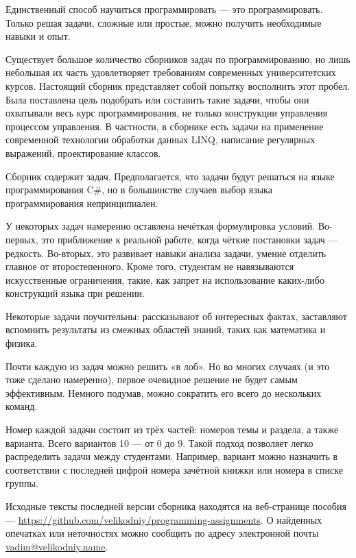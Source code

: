 
Единственный способ научиться программировать — это
программировать. Только решая задачи, сложные или простые, можно
получить необходимые навыки и опыт.

Существует большое количество сборников задач по программированию, но
лишь небольшая их часть удовлетворяет требованиям современных
университетских курсов. Настоящий сборник представляет собой попытку
восполнить этот пробел. Была поставлена цель подобрать или составить
такие задачи, чтобы они охватывали весь курс программирования, не
только конструкции управления процессом управления. В частности, в
сборнике есть задачи на применение современной технологии обработки
данных LINQ, написание регулярных выражений, проектирование классов.

Сборник содержит  задач. Предполагается, что задачи
будут решаться на языке программирования C\#, но в большинстве случаев
выбор языка программирования непринципиален.

У некоторых задач намеренно оставлена нечёткая формулировка
условий. Во-первых, это приближение к реальной работе, когда чёткие
постановки задач — редкость. Во-вторых, это развивает навыки анализа
задачи, умение отделить главное от второстепенного. Кроме того,
студентам не навязываются искусственные ограничения, такие, как запрет
на использование каких-либо конструкций языка при решении.

Некоторые задачи поучительны: рассказывают об интересных фактах,
заставляют вспомнить результаты из смежных областей знаний, таких как
математика и физика.

Почти каждую из задач можно решить «в лоб». Но во многих случаях (и
это тоже сделано намеренно), первое очевидное решение не будет самым
эффективным. Немного подумав, можно сократить его всего до нескольких
команд.

Номер каждой задачи состоит из трёх частей: номеров темы и раздела, а
также варианта. Всего вариантов 10 — от 0 до 9. Такой подход позволяет
легко распределить задачи между студентами. Например, вариант можно
назначить в соответствии с последней цифрой номера зачётной книжки или
номера в списке группы.




Исходные тексты последней версии сборника находятся на веб-странице
пособия —
\url{https://github.com/velikodniy/programming-assignments}. О найденных
опечатках или неточностях можно сообщить по адресу электронной почты
\href{mailto:vadim@veikodniy.name}{vadim@velikodniy.name}.
